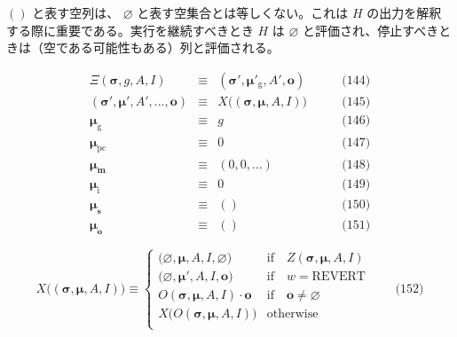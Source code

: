 \documentclass[
]{ltjsarticle}
\begin{document}
\hypertarget{empty_sequence_vs_empty_set}{}

\(()\) と表す空列は、 \(\varnothing\) と表す空集合とは等しくない。これは
\(H\) の出力を解釈する際に重要である。実行を継続すべきとき \(H\) は
\(\varnothing\)
と評価され、停止すべきときは（空である可能性もある）列と評価される。

\protect\hypertarget{eq-144}{}{}\protect\hypertarget{eq-145}{}{}\protect\hypertarget{eq-146}{}{}\protect\hypertarget{eq-147}{}{}\protect\hypertarget{eq-148}{}{}\protect\hypertarget{eq-149}{}{}\protect\hypertarget{eq-150}{}{}\protect\hypertarget{eq-151}{}{}

\[\begin{aligned}
\Xi(\boldsymbol{\sigma}, g, A, I) & \equiv & (\boldsymbol{\sigma}'\!, \boldsymbol{\mu}'_{\mathrm{g}}, A', \mathbf{o}) & \qquad \text{(144)} \\
(\boldsymbol{\sigma}', \boldsymbol{\mu}'\!, A', ..., \mathbf{o}) & \equiv & X\big((\boldsymbol{\sigma}, \boldsymbol{\mu}, A, I)\big) & \qquad \text{(145)} \\
\boldsymbol{\mu}_{\mathrm{g}} & \equiv & g & \qquad \text{(146)} \\
\boldsymbol{\mu}_{\mathrm{pc}} & \equiv & 0 & \qquad \text{(147)} \\
\boldsymbol{\mu}_{\mathbf{m}} & \equiv & (0, 0, ...) & \qquad \text{(148)} \\
\boldsymbol{\mu}_{\mathrm{i}} & \equiv & 0 & \qquad \text{(149)} \\
\boldsymbol{\mu}_{\mathbf{s}} & \equiv & () & \qquad \text{(150)} \\
\boldsymbol{\mu}_{\mathbf{o}} & \equiv & () & \qquad \text{(151)}
\end{aligned}\]

\protect\hypertarget{eq-152}{}{}\protect\hypertarget{eq:X-def}{}{}

\[X\big( (\boldsymbol{\sigma}, \boldsymbol{\mu}, A, I) \big) \equiv \begin{cases}
\big(\varnothing, \boldsymbol{\mu}, A, I, \varnothing\big) & \text{if} \quad Z(\boldsymbol{\sigma}, \boldsymbol{\mu}, A, I) \\
\big(\varnothing, \boldsymbol{\mu}', A, I, \mathbf{o}\big) & \text{if} \quad w = \text{REVERT} \\
O(\boldsymbol{\sigma}, \boldsymbol{\mu}, A, I) \cdot \mathbf{o} & \text{if} \quad \mathbf{o} \neq \varnothing \\
X\big(O(\boldsymbol{\sigma}, \boldsymbol{\mu}, A, I)\big) & \text{otherwise} \\
\end{cases} \qquad \text{(152)}\]
\end{document}
